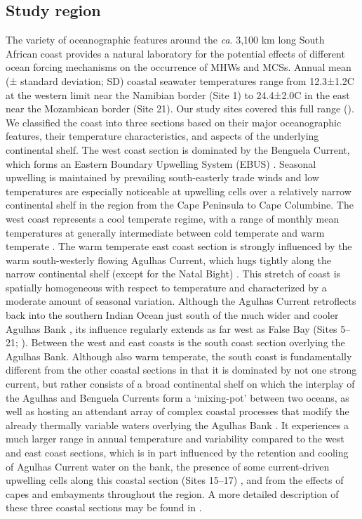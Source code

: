 \documentclass[a4paper,10pt,review]{elsarticle}
\begin{document}
\subsection{Study region}
The variety of oceanographic features around the \emph{ca}. 3,100 km long South African coast provides a natural laboratory for the potential effects of different ocean forcing mechanisms on the occurrence of MHWs and MCSs. Annual mean (± standard deviation; SD) coastal seawater temperatures range from 12.3±1.2\degree C at the western limit near the Namibian border (Site 1) to 24.4±2.0\degree C in the east near the Mozambican border (Site 21). Our study sites covered this full range (). We classified the coast into three sections based on their major oceanographic features, their temperature characteristics, and aspects of the underlying continental shelf. The west coast section is dominated by the Benguela Current, which forms an Eastern Boundary Upwelling System (EBUS) \citep{Hutchings2009}. Seasonal upwelling is maintained by prevailing south-easterly trade winds and low temperatures are especially noticeable at upwelling cells over a relatively narrow continental shelf in the region from the Cape Peninsula to Cape Columbine. The west coast represents a cool temperate regime, with a range of monthly mean temperatures at generally intermediate between cold temperate and warm temperate \citep{Luning1990}. The warm temperate east coast section is strongly influenced by the warm south-westerly flowing Agulhas Current, which hugs tightly along the narrow continental shelf (except for the Natal Bight) \citep{Luning1990}. This stretch of coast is spatially homogeneous with respect to temperature and characterized by a moderate amount of seasonal variation. Although the Agulhas Current retroflects back into the southern Indian Ocean \citep{Hutchings2009} just south of the much wider and cooler Agulhas Bank \citep{Roberts2005}, its influence regularly extends as far west as False Bay (Sites 5--21; ). Between the west and east coasts is the south coast section overlying the Agulhas Bank. Although also warm temperate, the south coast is fundamentally different from the other coastal sections in that it is dominated by not one strong current, but rather consists of a broad continental shelf on which the interplay of the Agulhas and Benguela Currents form a `mixing-pot' between two oceans, as well as hosting an attendant array of complex coastal processes that modify the already thermally variable waters overlying the Agulhas Bank \citep{Lutjeharms2003, Roberts2005, Hutchings2009}. It experiences a much larger range in annual temperature and variability compared to the west and east coast sections, which is in part influenced by the retention and cooling of Agulhas Current water on the bank, the presence of some current-driven upwelling cells along this coastal section (Sites 15--17) \citep{Roberts2005}, and from the effects of capes and embayments throughout the region. A more detailed description of these three coastal sections may be found in \citet{Smit2013}.
\end{document}
